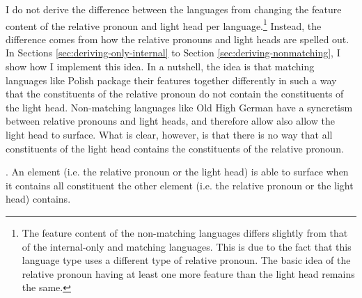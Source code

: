 I do not derive the difference between the languages from changing the feature content of the relative pronoun and light head per language.\footnote{
The feature content of the non-matching languages differs slightly from that of the internal-only and matching languages. This is due to the fact that this language type uses a different type of relative pronoun. The basic idea of the relative pronoun having at least one more feature than the light head remains the same.
}
Instead, the difference comes from how the relative pronouns and light heads are spelled out. In Sections \ref{sec:deriving-only-internal} to Section \ref{sec:deriving-nonmatching}, I show how I implement this idea. In a nutshell, the idea is that matching languages like Polish package their features together differently in such a way that the constituents of the relative pronoun do not contain the constituents of the light head. Non-matching languages like Old High German have a syncretism between relative pronouns and light heads, and therefore allow also allow the light head to surface.
What is clear, however, is that there is no way that all constituents of the light head contains the constituents of the relative pronoun.

\ex. An element (i.e. the relative pronoun or the light head) is able to surface when it contains all constituent the other element (i.e. the relative pronoun or the light head) contains.\label{ex:my-proposal}




%

